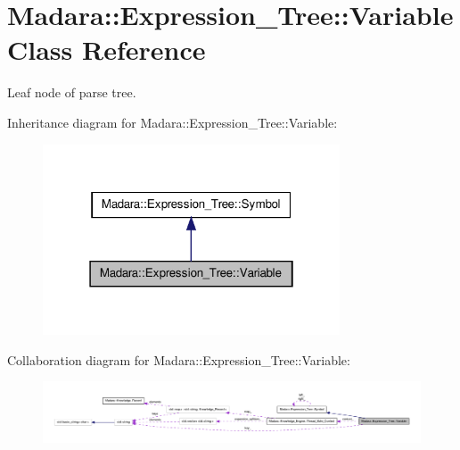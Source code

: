 \hypertarget{classMadara_1_1Expression__Tree_1_1Variable}{
\section{Madara::Expression\_\-Tree::Variable Class Reference}
\label{d8/d80/classMadara_1_1Expression__Tree_1_1Variable}
}


Leaf node of parse tree.  




Inheritance diagram for Madara::Expression\_\-Tree::Variable:
\nopagebreak
\begin{figure}[H]
\begin{center}
\leavevmode
\includegraphics[width=250pt]{d6/dc5/classMadara_1_1Expression__Tree_1_1Variable__inherit__graph}
\end{center}
\end{figure}


Collaboration diagram for Madara::Expression\_\-Tree::Variable:
\nopagebreak
\begin{figure}[H]
\begin{center}
\leavevmode
\includegraphics[width=400pt]{de/d23/classMadara_1_1Expression__Tree_1_1Variable__coll__graph}
\end{center}
\end{figure}
